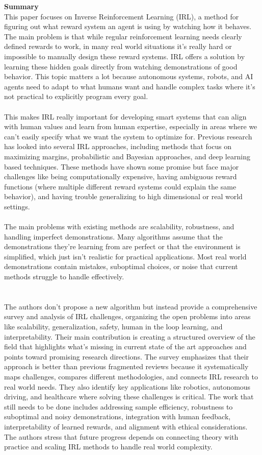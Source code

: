 \documentclass[report.tex]{subfiles}
\begin{document}
\noindent\textbf{Summary} \\
This paper focuses on Inverse Reinforcement Learning (IRL), a method for figuring out what reward system an agent is using by watching how it behaves. The main problem is that while regular reinforcement learning needs clearly defined rewards to work, in many real world situations it's really hard or impossible to manually design these reward systems. IRL offers a solution by learning these hidden goals directly from watching demonstrations of good behavior. This topic matters a lot because autonomous systems, robots, and AI agents need to adapt to what humans want and handle complex tasks where it's not practical to explicitly program every goal.\\\\ This makes IRL really important for developing smart systems that can align with human values and learn from human expertise, especially in areas where we can't easily specify what we want the system to optimize for.
Previous research has looked into several IRL approaches, including methods that focus on maximizing margins, probabilistic and Bayesian approaches, and deep learning based techniques. These methods have shown some promise but face major challenges like being computationally expensive, having ambiguous reward functions (where multiple different reward systems could explain the same behavior), and having trouble generalizing to high dimensional or real world settings. \\\\The main problems with existing methods are scalability, robustness, and handling imperfect demonstrations. Many algorithms assume that the demonstrations they're learning from are perfect or that the environment is simplified, which just isn't realistic for practical applications. Most real world demonstrations contain mistakes, suboptimal choices, or noise that current methods struggle to handle effectively.\\\\\\
\noindent\textbf{}The authors don't propose a new algorithm but instead provide a comprehensive survey and analysis of IRL challenges, organizing the open problems into areas like scalability, generalization, safety, human in the loop learning, and interpretability. Their main contribution is creating a structured overview of the field that highlights what's missing in current state of the art approaches and points toward promising research directions. The survey emphasizes that their approach is better than previous fragmented reviews because it systematically maps challenges, compares different methodologies, and connects IRL research to real world needs. They also identify key applications like robotics, autonomous driving, and healthcare where solving these challenges is critical. The work that still needs to be done includes addressing sample efficiency, robustness to suboptimal and noisy demonstrations, integration with human feedback, interpretability of learned rewards, and alignment with ethical considerations. The authors stress that future progress depends on connecting theory with practice and scaling IRL methods to handle real world complexity.\\
\end{document}
